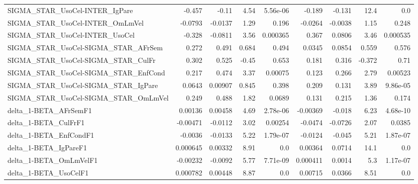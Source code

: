 \begin{tabular}{lrrrrrrrr}
SIGMA\_STAR\_UsoCel-INTER\_IgPare        &      -0.457 &        -0.11 &     4.54 & 5.56e-06 &     -0.189 &      -0.131 &         12.4 &           0.0 \\
SIGMA\_STAR\_UsoCel-INTER\_OmLmVel       &     -0.0793 &      -0.0137 &     1.29 &    0.196 &    -0.0264 &     -0.0038 &         1.15 &         0.248 \\
SIGMA\_STAR\_UsoCel-INTER\_UsoCel        &      -0.328 &      -0.0811 &     3.56 & 0.000365 &      0.367 &      0.0806 &         3.46 &      0.000535 \\
SIGMA\_STAR\_UsoCel-SIGMA\_STAR\_AFrSem   &       0.272 &        0.491 &    0.684 &    0.494 &     0.0345 &      0.0854 &        0.559 &         0.576 \\
SIGMA\_STAR\_UsoCel-SIGMA\_STAR\_CulFr    &       0.302 &        0.525 &    -0.45 &    0.653 &      0.181 &       0.316 &       -0.372 &          0.71 \\
SIGMA\_STAR\_UsoCel-SIGMA\_STAR\_EnfCond  &       0.217 &        0.474 &     3.37 &  0.00075 &      0.123 &       0.266 &         2.79 &       0.00523 \\
SIGMA\_STAR\_UsoCel-SIGMA\_STAR\_IgPare   &      0.0643 &      0.00907 &    0.845 &    0.398 &      0.209 &       0.131 &         3.89 &      9.86e-05 \\
SIGMA\_STAR\_UsoCel-SIGMA\_STAR\_OmLmVel  &       0.249 &        0.488 &     1.82 &   0.0689 &      0.131 &       0.215 &         1.36 &         0.174 \\
delta\_1-BETA\_AFrSemF1                 &     0.00136 &      0.00458 &     4.69 & 2.78e-06 &   -0.00369 &      -0.018 &         6.23 &      4.68e-10 \\
delta\_1-BETA\_CulFrF1                  &    -0.00471 &      -0.0112 &     3.02 &  0.00254 &    -0.0474 &     -0.0726 &         2.07 &        0.0385 \\
delta\_1-BETA\_EnfCondF1                &     -0.0036 &      -0.0133 &     5.22 & 1.79e-07 &    -0.0124 &      -0.045 &         5.21 &      1.87e-07 \\
delta\_1-BETA\_IgPareF1                 &    0.000645 &      0.00332 &     8.91 &      0.0 &    0.00364 &      0.0714 &         14.1 &           0.0 \\
delta\_1-BETA\_OmLmVelF1                &    -0.00232 &      -0.0092 &     5.77 & 7.71e-09 &   0.000411 &      0.0014 &          5.3 &      1.17e-07 \\
delta\_1-BETA\_UsoCelF1                 &    0.000782 &      0.00448 &     8.87 &      0.0 &    0.00715 &      0.0366 &         8.51 &           0.0 \\

\end{tabular}
